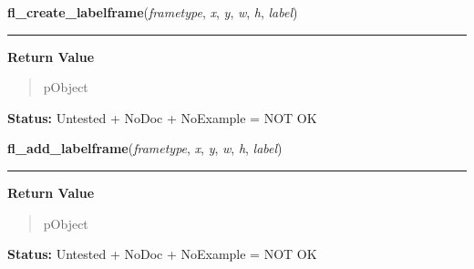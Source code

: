     \label{xformslib:library:fl_create_labelframe}

    \vspace{0.5ex}

\hspace{.8\funcindent}\begin{boxedminipage}{\funcwidth}

    \raggedright \textbf{fl\_create\_labelframe}(\textit{frametype}, \textit{x}, \textit{y}, \textit{w}, \textit{h}, \textit{label})

    \vspace{-1.5ex}

    \rule{\textwidth}{0.5\fboxrule}
\setlength{\parskip}{2ex}
\setlength{\parskip}{1ex}
      \textbf{Return Value}
    \vspace{-1ex}

      \begin{quote}
      pObject

      \end{quote}

\textbf{Status:} Untested + NoDoc + NoExample = NOT OK



    \end{boxedminipage}

    \label{xformslib:library:fl_add_labelframe}

    \vspace{0.5ex}

\hspace{.8\funcindent}\begin{boxedminipage}{\funcwidth}

    \raggedright \textbf{fl\_add\_labelframe}(\textit{frametype}, \textit{x}, \textit{y}, \textit{w}, \textit{h}, \textit{label})

    \vspace{-1.5ex}

    \rule{\textwidth}{0.5\fboxrule}
\setlength{\parskip}{2ex}
\setlength{\parskip}{1ex}
      \textbf{Return Value}
    \vspace{-1ex}

      \begin{quote}
      pObject

      \end{quote}

\textbf{Status:} Untested + NoDoc + NoExample = NOT OK



    \end{boxedminipage}

